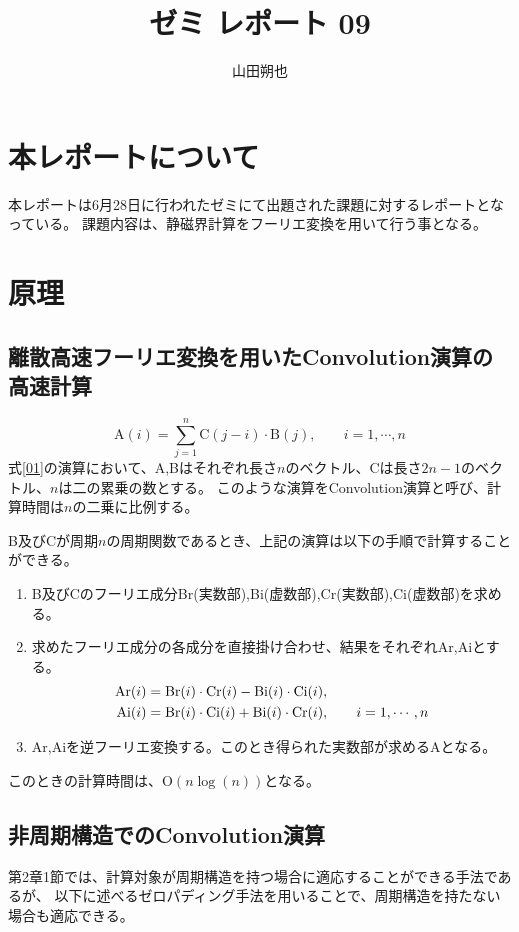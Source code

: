 \documentclass{jsarticle}
\begin{document}
\title{ゼミ レポート 09}
\author{山田朔也}
\maketitle

\section{本レポートについて}
本レポートは6月28日に行われたゼミにて出題された課題に対するレポートとなっている。
課題内容は、静磁界計算をフーリエ変換を用いて行う事となる。

\section{原理}
\subsection{離散高速フーリエ変換を用いたConvolution演算の高速計算}
\begin{equation}
	\mathrm{A}(i)=\sum_{j=1}^{n} \mathrm{C}(j-i)\cdot \mathrm{B}(j),\;\;\;\;\;\;\;i=1,\cdots,n
	\label{01}
\end{equation}
式\ref{01}の演算において、A,Bはそれぞれ長さ$n$のベクトル、Cは長さ$2n-1$のベクトル、$n$は二の累乗の数とする。
このような演算をConvolution演算と呼び、計算時間は$n$の二乗に比例する。

B及びCが周期$n$の周期関数であるとき、上記の演算は以下の手順で計算することができる。
\begin{enumerate}
	\item B及びCのフーリエ成分Br(実数部),Bi(虚数部),Cr(実数部),Ci(虚数部)を求める。
	\item 求めたフーリエ成分の各成分を直接掛け合わせ、結果をそれぞれAr,Aiとする。
		\begin{align}
			\mathrm{Ar}(i) &= \mathrm{Br}(i)\cdot\mathrm{Cr}(i)-\mathrm{Bi}(i)\cdot\mathrm{Ci}(i),								\notag \\
			\mathrm{Ai}(i) &= \mathrm{Br}(i)\cdot\mathrm{Ci}(i)+\mathrm{Bi}(i)\cdot\mathrm{Cr}(i),\;\;\;\;\;\;\;i=1,\cdots,n	\notag
		\end{align}
	\item Ar,Aiを逆フーリエ変換する。このとき得られた実数部が求めるAとなる。
\end{enumerate}
このときの計算時間は、$\mathrm{O}(n \log (n))$となる。

\subsection{非周期構造でのConvolution演算}
第2章1節では、計算対象が周期構造を持つ場合に適応することができる手法であるが、
以下に述べるゼロパディング手法を用いることで、周期構造を持たない場合も適応できる。
\end{document}
